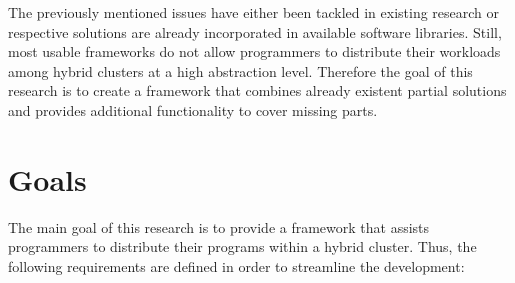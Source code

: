 The previously mentioned issues have either been tackled in existing research or respective solutions are already incorporated in available software libraries. Still, most usable frameworks do not allow programmers to distribute their workloads among hybrid clusters at a high abstraction level. Therefore the goal of this research is to create a framework that combines already existent partial solutions and provides additional functionality to cover missing parts.

\section{Goals}
\label{goals}
The main goal of this research is to provide a framework that assists programmers to distribute their programs within a hybrid cluster. Thus, the following requirements are defined in order to streamline the development:

